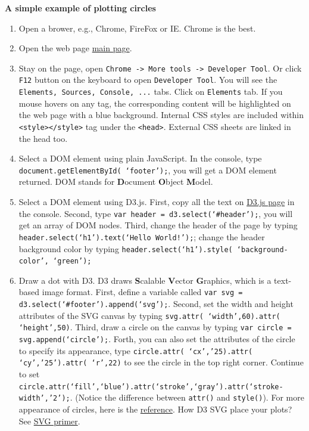 \documentclass[a4paper, 11pt]{article}
\begin{document}
\textbf{A simple example of plotting circles}
\begin{enumerate}
\item Open a brower, e.g., Chrome, FireFox or IE. Chrome is the best.
\item Open the web page \href{http://nymph332088.github.io/CIS4340/index.html}{main page}.
\item Stay on the page, open \texttt{Chrome -> More tools -> Developer Tool}. Or click \texttt{F12} button on the keyboard to open \texttt{Developer Tool}. You will see the \texttt{Elements, Sources, Console, ...} tabs. Click on \texttt{Elements} tab. If you mouse hovers on any tag, the corresponding content will be highlighted on the web page with a blue background. Internal CSS styles are included within \texttt{<style></style>} tag under the \texttt{<head>}. External CSS sheets are linked in the head too.
\item Select a DOM element using plain JavaScript. In the console, type \texttt{document.getElementById( `footer');}, you will get a DOM element returned. DOM stands for {\bf D}ocument {\bf O}bject {\bf M}odel.
\item Select a DOM element using D3.js. First, copy all the text on \href{https://raw.githubusercontent.com/mbostock/d3/master/d3.min.js}{D3.js page} in the console. Second, type \texttt{var header = d3.select(`\#{header}');}, you will get an array of DOM nodes. Third, change the header of the page by typing \texttt{header.select(`h1').text(`Hello World!');}; change the header background color by typing \texttt{header.select(`h1').style( `background-color', `green');}
\item Draw a dot with D3. D3 draws {\bf S}calable {\bf V}ector {\bf G}raphics, which is a text-based image format. First, define a variable called \texttt{var svg = d3.select(`\#{footer}').append(`svg');}. Second, set the width and height attributes of the SVG canvas by typing {\tt svg.attr( `width',60).attr( `height',50)}. Third, draw a circle on the canvas by typing \texttt{var circle = svg.append(`circle');}. Forth, you can also set the attributes of the circle to specify its appearance, type \texttt{circle.attr( `cx','25).attr( `cy','25').attr( `r',22)} to see the circle in the top right corner. Continue to set \texttt{circle.attr(`fill',`blue').attr(`stroke',`gray').attr(`stroke-width','2');}. (Notice the difference between \texttt{attr()} and \texttt{style()}). For more appearance of circles, here is the \href{http://alignedleft.com/tutorials/d3/an-svg-primer}{reference}. How D3 SVG place your plots? See \href{http://alignedleft.com/tutorials/d3/an-svg-primer}{SVG primer}.


\end{enumerate}
\end{document}
